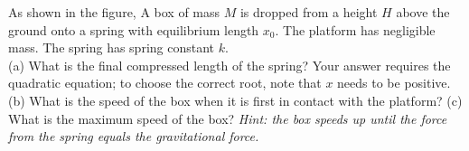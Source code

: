 As shown in the figure, A box of mass $M$ is dropped from a height $H$ above the ground onto
a spring with equilibrium length $x_0$. The
platform has negligible mass. The spring has spring constant $k$.\\
%
(a) What is the final compressed length of the spring? Your answer
requires the quadratic equation; to choose the correct root, note
that $x$ needs to be positive.\answercheck\hwendpart
%
(b) What is the speed of the box when it is first in contact with the
platform?\answercheck\hwendpart
%
(c) What is the maximum speed of the box? \emph{Hint: the box speeds
up until the force from the spring equals the gravitational force.}\answercheck
